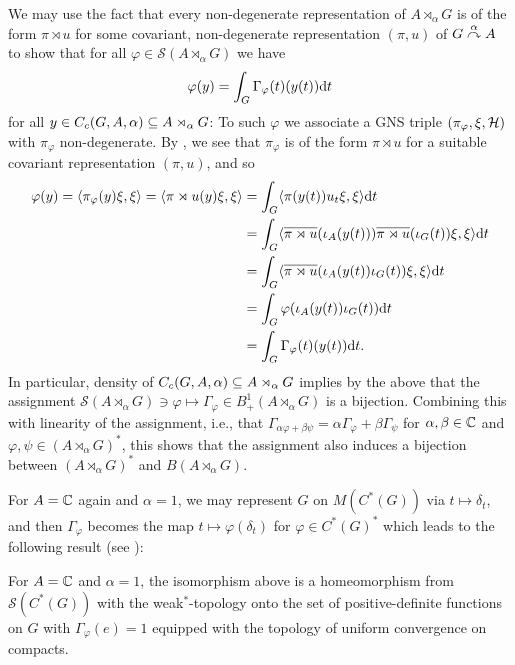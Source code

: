 \begin{remark}
We may use the fact that every non-degenerate representation of $A \rtimes_\alpha G$ is of the form $\pi \rtimes u$ for some covariant, non-degenerate representation $(\pi,u)$ of $G \stackrel{\alpha}{\curvearrowright} A$ to show that for all $\varphi \in \mathcal{S}(A \rtimes_\alpha G)$ we have
\begin{align}
	\varphi(y) = \int_G \Gamma_\varphi(t)(y(t)) \mathrm{d} t
	\label{eq:gammafun}
\end{align}
for all $y \in C_c(G,A,\alpha) \subseteq A \rtimes_\alpha G$: To such $\varphi$ we associate a GNS triple $(\pi_\varphi,\xi, \mathcal{H})$ with $\pi_{\varphi}$ non-degenerate. By , we see that $\pi_\varphi$ is of the form $\pi \rtimes u$ for a suitable covariant representation $(\pi,u)$, and so
\begin{align*}
\varphi(y) = \langle \pi_\varphi(y) \xi, \xi \rangle = \langle \pi \rtimes u(y) \xi, \xi\rangle &= \int_G \langle \pi(y(t)) u_t \xi, \xi \rangle \mathrm{d} t\\
&= \int_G \langle \overline{\pi \rtimes u }(\iota_A(y(t))) \overline{\pi \rtimes u } (\iota_G(t)) \xi , \xi \rangle \mathrm{d} t\\
&= \int_G \langle \overline{\pi \rtimes u} (\iota_A(y(t)) \iota_G(t)) \xi , \xi \rangle\mathrm{d} t\\
&= \int_G \varphi(\iota_A(y(t)) \iota_G(t)) \mathrm{d} t \\
&= \int_G \Gamma_\varphi (t) (y(t)) \mathrm{d} t.
\end{align*}
In particular, density of $C_c(G, A,\alpha) \subseteq A \rtimes_\alpha G$ implies by the above that the assignment $\mathcal{S}(A \rtimes_\alpha G) \ni \varphi \mapsto \Gamma_\varphi \in B_+^1(A \rtimes_\alpha G)$ is a bijection. Combining this with linearity of the assignment, i.e., that $\Gamma_{\alpha \varphi + \beta \psi}= \alpha \Gamma_\varphi + \beta \Gamma_\psi$ for $\alpha, \beta \in \mathbb{C}$ and $\varphi, \psi \in (A \rtimes_\alpha G)^*$, this shows that the assignment also induces a bijection between $(A \rtimes_\alpha G )^*$ and $B(A \rtimes_\alpha G)$.
\end{remark}
For $A = \mathbb{C}$ again and $\alpha = 1$, we may represent $G$ on $M(C^*(G))$ via $t \mapsto \delta_t$, and then $\Gamma_\varphi$ becomes the map $t \mapsto \varphi(\delta_t)$ for $ \varphi \in C^*(G)^*$ which leads to the following result (see \cite[7.1.11]{pedersenalgauto}):
\begin{proposition}
For $A= \mathbb{C}$ and $\alpha = 1$, the isomorphism above is a homeomorphism from $\mathcal{S}(C^*(G))$ with the weak$^*$-topology onto the set of positive-definite functions on $G$ with $\Gamma_\varphi(e)=1$ equipped with the topology of uniform convergence on compacts.
\label{mult:OGstatehomeo}
\end{proposition}

